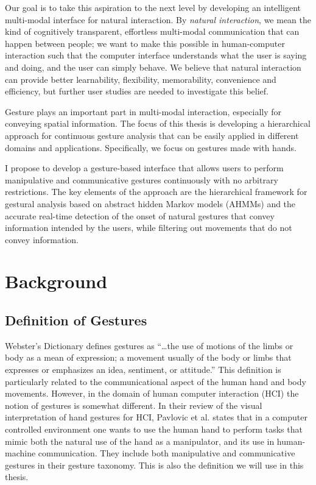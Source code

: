 Our goal is to take this aspiration to the next level by developing an
intelligent multi-modal interface for natural interaction. By \textit{natural
interaction}, we mean the kind of cognitively transparent, effortless
multi-modal communication that can happen between people; we want to make this possible in
human-computer interaction such that the computer interface understands what the
user is saying and doing, and the user can simply behave. We believe that
natural interaction can provide better learnability, flexibility, memorability,
convenience and efficiency, but further user studies are needed to investigate
this belief.

Gesture plays an important part in multi-modal interaction, especially for
conveying spatial information. The focus of this thesis is developing a
hierarchical approach for continuous gesture analysis that can be easily
applied in different domains and applications. Specifically, we focus on
gestures made with hands. 

I propose to develop a gesture-based interface that allows users to perform
manipulative and communicative gestures continuously with no arbitrary
restrictions. The key elements of the approach are the hierarchical framework
for gestural analysis based on abstract hidden Markov models (AHMMs) and the
accurate real-time detection of the onset of natural gestures that convey 
information intended by the users, while filtering out movements that do not 
convey information.

\section{Background}
\subsection{Definition of Gestures}
Webster's Dictionary defines gestures as ``\ldots the use of motions of the
limbs or body as a mean of expression; a movement usually of the body or limbs
that expresses or emphasizes an idea, sentiment, or attitude.'' This definition
is particularly related to the communicational aspect of the human hand and body
movements. However, in the domain of human computer interaction (HCI) the notion
of gestures is somewhat different. In their review of the visual interpretation
of hand gestures for HCI, Pavlovic et al. \cite{Pavlovic97} states that in a computer
controlled environment one wants to use the human hand to perform tasks that
mimic both the natural use of the hand as a manipulator, and its use in
human-machine communication. They include both manipulative and communicative
gestures in their gesture taxonomy. This is also the definition we will use in
this thesis.

